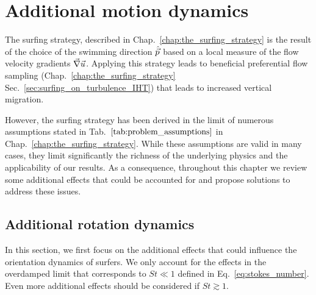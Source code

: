 \chapter{Additional motion dynamics}\label{app:additional_motion}

The surfing strategy, described in Chap.~\ref{chap:the_surfing_strategy} is the result of the choice of the swimming direction $\hat{\vec{p}}$ based on a local measure of the flow velocity gradients $\vec{\nabla} \vec{u}$.
Applying this strategy leads to beneficial preferential flow sampling (Chap.~\ref{chap:the_surfing_strategy} Sec.~\ref{sec:surfing_on_turbulence_IHT}) that leads to increased vertical migration.

However, the surfing strategy has been derived in the limit of numerous assumptions stated in Tab.~$\ref{tab:problem_assumptions}$ in Chap.~\ref{chap:the_surfing_strategy}.
While these assumptions are valid in many cases, they limit significantly the richness of the underlying physics and the applicability of our results.
As a consequence, throughout this chapter we review some additional effects that could be accounted for and propose solutions to address these issues.


\section{Additional rotation dynamics}\label{sec:additional_rotation}

In this section, we first focus on the additional effects that could influence the orientation dynamics of surfers.
We only account for the effects in the overdamped limit that corresponds to $\mathit{St} \ll 1$ defined in Eq.~\eqref{eq:stokes_number}.
Even more additional effects should be considered if $\mathit{St} \gtrsim 1$.


